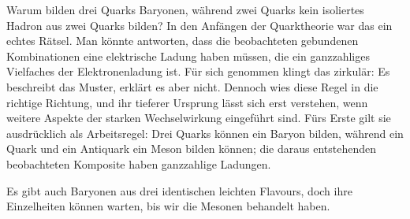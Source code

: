 \begin{classroomqa}
\end{classroomqa}

\begin{classroomqa}
\end{classroomqa}

\begin{classroomqa}
\end{classroomqa}

Warum bilden drei Quarks Baryonen, während zwei Quarks kein isoliertes Hadron aus zwei Quarks bilden? In den Anfängen der Quarktheorie war das ein echtes Rätsel. Man könnte antworten, dass die beobachteten gebundenen Kombinationen eine elektrische Ladung haben müssen, die ein ganzzahliges Vielfaches der Elektronenladung ist. Für sich genommen klingt das zirkulär: Es beschreibt das Muster, erklärt es aber nicht. Dennoch wies diese Regel in die richtige Richtung, und ihr tieferer Ursprung lässt sich erst verstehen, wenn weitere Aspekte der starken Wechselwirkung eingeführt sind. Fürs Erste gilt sie ausdrücklich als Arbeitsregel: Drei Quarks können ein Baryon bilden, während ein Quark und ein Antiquark ein Meson bilden können; die daraus entstehenden beobachteten Komposite haben ganzzahlige Ladungen.

Es gibt auch Baryonen aus drei identischen leichten Flavours, doch ihre Einzelheiten können warten, bis wir die Mesonen behandelt haben.


